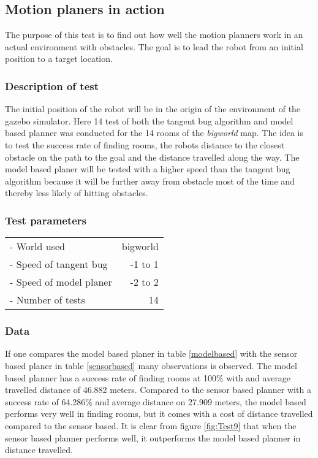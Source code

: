\documentclass[../Head/Main.tex]{subfiles}
\begin{document}
\subsection{Motion planers in action}
\label{subsec:testMotionPlanning}

The purpose of this test is to find out how well the motion planners work in an actual environment with obstacles. The goal is to lead the robot from an initial position to a target location. 

\subsubsection{Description of test}

The initial position of the robot will be in the origin of the environment of the gazebo simulator. Here 14 test of both the tangent bug algorithm and model based planner was conducted for the 14 rooms of the \textit{bigworld} map. The idea is to test the success rate of finding rooms, the robots distance to the closest obstacle on the path to the goal and the distance travelled along the way. The model based planer will be tested with a higher speed than the tangent bug algorithm because it will be further away from obstacle most of the time and thereby less likely of hitting obstacles.           

\subsubsection{Test parameters}

\begin{tabular}{l r}
	- World used                & bigworld\\	
	- Speed of tangent bug      & -1 to 1\\
	- Speed of model planer     & -2 to 2\\
	- Number of tests           & 14
\end{tabular}

\subsubsection{Data}

If one compares the model based planer in table \ref{modelbased} with the sensor based planer in table \ref{sensorbased} many observations is observed. The model based planner has a success rate of finding rooms at 100\% with and average travelled distance of 46.882 meters. Compared to the sensor based planner with a success rate of 64.286\% and average distance on 27.909 meters, the model based performs very well in finding rooms, but it comes with a cost of distance travelled compared to the sensor based. It is clear from figure \ref{fig:Test9} that when the sensor based planner performs well, it outperforms the model based planner in distance travelled.    
\end{document}
